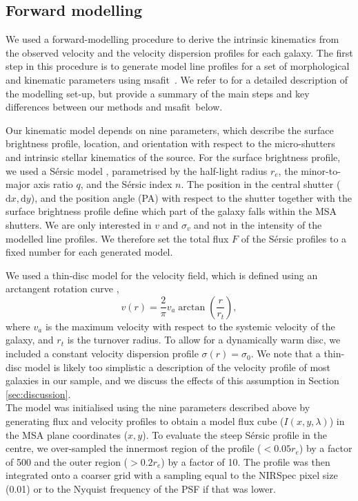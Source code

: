 \documentclass{aa}
\newcommand{\dd}{\ensuremath{\mathrm{d}}}
\newcommand{\msafit}{{\sc msafit}}
\begin{document}
\subsection{Forward modelling}\label{sec:forward_model}
We used a forward-modelling procedure to derive the intrinsic kinematics from the observed velocity and the velocity dispersion profiles for each galaxy. The first step in this procedure is to generate model line profiles for a set of morphological and kinematic parameters using \msafit\ \citep{AdeGraaff2024_kinematics}. We refer to \citet{AdeGraaff2024_kinematics} for a detailed description of the modelling set-up, but provide a summary of the main steps and key differences between our methods and \msafit\ below.

Our kinematic model depends on nine parameters, which describe the surface brightness profile, location, and orientation with respect to the micro-shutters and intrinsic stellar kinematics of the source. For the surface brightness profile, we used a S\'ersic model \citep{JSersic1968}, parametrised by the half-light radius $r_e$, the minor-to-major axis ratio $q$, and the S\'ersic index $n$. The position in the central shutter ($\dd x, \dd y$), and the position angle (PA) with respect to the shutter together with the surface brightness profile define which part of the galaxy falls within the MSA shutters. We are only interested in $v$ and $\sigma_v$ and not in the intensity of the modelled line profiles. We therefore set the total flux $F$ of the S\'ersic profiles to a fixed number for each generated model. 

We used a thin-disc model for the velocity field, which is defined using an arctangent rotation curve \citep{SCourteau1997},
\begin{equation}\label{eq:arctan_v}
    v(r) = \frac{2}{\pi} v_a \arctan\left(\frac{r}{r_t}\right),
\end{equation}
where $v_a$ is the maximum velocity with respect to the systemic velocity of the galaxy, and $r_t$ is the turnover radius. To allow for a dynamically warm disc, we included a constant velocity dispersion profile $\sigma(r) = \sigma_0$. We note that a thin-disc model is likely too simplistic a description of the velocity profile of most galaxies in our sample, and we discuss the effects of this assumption in Section \ref{sec:discussion}.\\

The model was initialised using the nine parameters described above by generating flux and velocity profiles to obtain a model flux cube ($I(x,y,\lambda)$) in the MSA plane coordinates ($x, y$). To evaluate the steep S\'ersic profile in the centre, we over-sampled the innermost region of the profile ($< 0.05 r_e$) by a factor of 500 and the outer region ($> 0.2 r_e$) by a factor of 10. The profile was then integrated onto a coarser grid with a sampling equal to the NIRSpec pixel size (0.01\arcsec) or to the Nyquist frequency of the PSF if that was lower.
\end{document}
